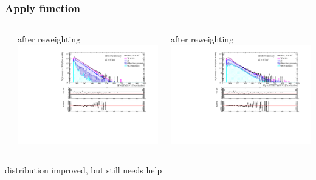 \documentclass[bigger]{beamer}
\begin{document}
\begin{frame}
\frametitle{Apply \met function}
\label{sec-1-9-5}
\begin{columns} %
\label{sec-1-9-5-1}
\begin{column}{0.6\textwidth}
\label{sec-1-9-5-1-1}

\centering
\met after \met reweighting
\includegraphics[width=\textwidth]{fig/enu/reweight/MET_PAS_enujjMETReweighted.pdf}
\end{column}
\begin{column}{0.6\textwidth}
\label{sec-1-9-5-1-2}

\centering
\mt after \met reweighting
\includegraphics[width=\textwidth]{fig/enu/reweight/MTenu_PAS_enujjMETReweighted.pdf}
\end{column}
\end{columns}
\label{sec-1-9-5-2}

\small
\centering
\met distribution improved, but \mt still needs help
\end{frame}
\end{document}
